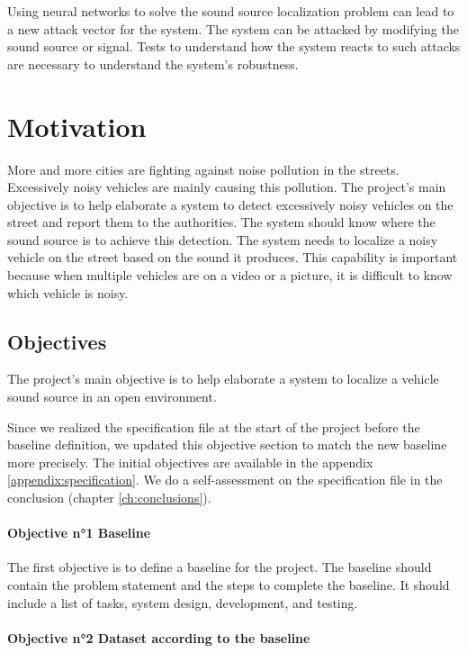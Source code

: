 Using neural networks to solve the sound source localization problem can lead to a new attack vector for the system. The system can be attacked by modifying the sound source or signal. Tests to understand how the system reacts to such attacks are necessary to understand the system's robustness.

\section{Motivation}
\label{intro:motivation}

More and more cities are fighting against noise pollution in the streets. Excessively noisy vehicles are mainly causing this pollution. The project's main objective is to help elaborate a system to detect excessively noisy vehicles on the street and report them to the authorities. The system should know where the sound source is to achieve this detection. The system needs to localize a noisy vehicle on the street based on the sound it produces. This capability is important because when multiple vehicles are on a video or a picture, it is difficult to know which vehicle is noisy.

\subsection{Objectives}
The project's main objective is to help elaborate a system to localize a vehicle sound source in an open environment.

Since we realized the specification file at the start of the project before the baseline definition, we updated this objective section to match the new baseline more precisely. The initial objectives are available in the appendix \ref{appendix:specification}. We do a self-assessment on the specification file in the conclusion (chapter \ref{ch:conclusions}).

\paragraph{Objective n°1 Baseline}
\label{intro:objective1}

The first objective is to define a baseline for the project. The baseline should contain the problem statement and the steps to complete the baseline. It should include a list of tasks, system design, development, and testing. 

\paragraph{Objective n°2 Dataset according to the baseline}
\label{intro:objective2}

